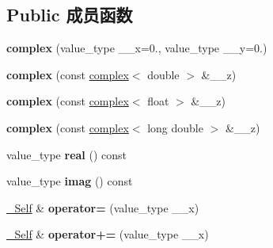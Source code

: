 \subsection*{Public 成员函数}
\begin{DoxyCompactItemize}
\item 
\mbox{\label{structcomplex_3_01double_01_4_a0d36894432b37d19aa4b20edff261977}} 
{\bfseries complex} (value\+\_\+type \+\_\+\+\_\+x=0., value\+\_\+type \+\_\+\+\_\+y=0.)
\item 
\mbox{\label{structcomplex_3_01double_01_4_a1e594c7d1768cc66cd58976370f64956}} 
{\bfseries complex} (const \hyperlink{structcomplex}{complex}$<$ double $>$ \&\+\_\+\+\_\+z)
\item 
\mbox{\label{structcomplex_3_01double_01_4_ae6e20094ecda7e6d2ae9434d5cbf1c18}} 
{\bfseries complex} (const \hyperlink{structcomplex}{complex}$<$ float $>$ \&\+\_\+\+\_\+z)
\item 
\mbox{\label{structcomplex_3_01double_01_4_a8e39c80405c1d5148efba0768d2da505}} 
{\bfseries complex} (const \hyperlink{structcomplex}{complex}$<$ long double $>$ \&\+\_\+\+\_\+z)
\item 
\mbox{\label{structcomplex_3_01double_01_4_a9472e76406a803da9a41110b0bbf4b27}} 
value\+\_\+type {\bfseries real} () const
\item 
\mbox{\label{structcomplex_3_01double_01_4_a616b57c9046c91b4d5d7ff079d0218df}} 
value\+\_\+type {\bfseries imag} () const
\item 
\mbox{\label{structcomplex_3_01double_01_4_a6222d4f47552b48ba74dde0146cd5566}} 
\hyperlink{structcomplex_3_01double_01_4}{\+\_\+\+Self} \& {\bfseries operator=} (value\+\_\+type \+\_\+\+\_\+x)
\item 
\mbox{\label{structcomplex_3_01double_01_4_ae9499df1667d7255c799a09f79321eaf}} 
\hyperlink{structcomplex_3_01double_01_4}{\+\_\+\+Self} \& {\bfseries operator+=} (value\+\_\+type \+\_\+\+\_\+x)
\item 

\end{DoxyCompactItemize}
